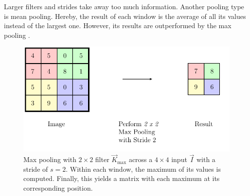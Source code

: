 Larger filters and strides take away too much information.
Another pooling type is mean pooling.
Hereby, the result of each window is the average of all its values instead of the largest one.
However, its results are outperformed by the max pooling \cite{Scherer2010}.
\begin{figure}
	\centering
	\includegraphics{images/pooling.pdf}
	\caption[Max pooling with $2 \times 2$ filter and stride $2$]{Max pooling with $2 \times 2$ filter $\vec{K}_{\text{max}}$ across a $4 \times 4$ input $\vec{I}$ with a stride of $s=2$. Within each window, the maximum of its values is computed. Finally, this yields a matrix with each maximum at its corresponding position.}
	\label{fig:pooling}
\end{figure}